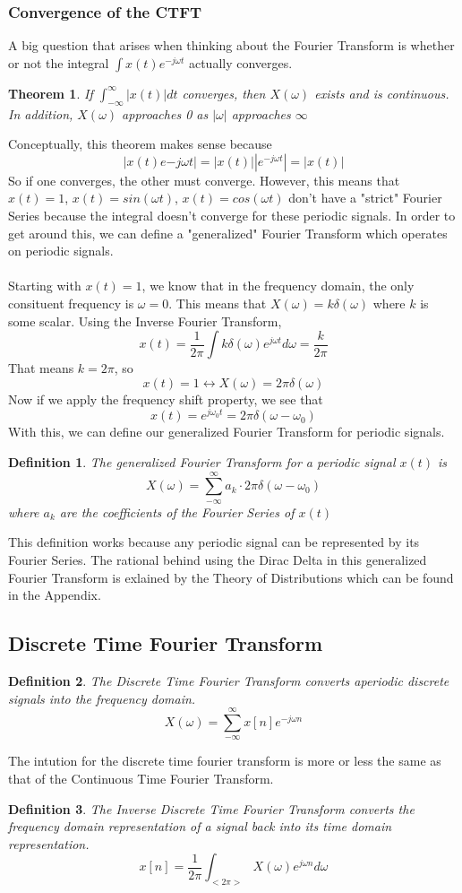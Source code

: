 \documentclass{article}
\newtheorem{theorem}{Theorem}
\newtheorem{definition}{Definition}
\begin{document}
\subsubsection{Convergence of the CTFT}
A big question that arises when thinking about the Fourier Transform is whether or not the integral $\int{x(t)e^{-j\omega t}}$
actually converges.
\begin{theorem}
    If $\int_{-\infty}^{\infty}{|x(t)|dt}$ converges, then $X(\omega)$ exists and is continuous.
    In addition, $X(\omega)$ approaches 0 as $|\omega|$ approaches $\infty$
\end{theorem}
Conceptually, this theorem makes sense because
$$|x(t)e{-j\omega t}| = |x(t)| |e^{-j\omega t}| = |x(t)|$$
So if one converges, the other must converge. However, this means that $x(t)=1$, $x(t)=sin(\omega t)$, $x(t)=cos(\omega t)$
don't have a "strict" Fourier Series because the integral doesn't converge for these periodic signals. In order to get around this,
we can define a "generalized" Fourier Transform which operates on periodic signals.\\\\
Starting with $x(t)=1$, we know that in the frequency domain, the only consituent frequency is $\omega=0$.
This means that $X(\omega) = k\delta(\omega)$ where $k$ is some scalar.
Using the Inverse Fourier Transform,
$$x(t) = \frac{1}{2\pi}\int{k\delta(\omega)e^{j\omega t}d\omega} = \frac{k}{2\pi}$$
That means $k = 2\pi$, so
$$x(t) = 1 \leftrightarrow X(\omega) = 2\pi \delta(\omega)$$
Now if we apply the frequency shift property, we see that
$$x(t) = e^{j\omega_0 t} = 2\pi \delta(\omega - \omega_0)$$
With this, we can define our generalized Fourier Transform for periodic signals.
\begin{definition}
    The generalized Fourier Transform for a periodic signal $x(t)$ is
    $$X(\omega) = \sum_{-\infty}^{\infty}{a_k\cdot 2\pi \delta(\omega - \omega_0)}$$
    where $a_k$ are the coefficients of the Fourier Series of $x(t)$
\end{definition}
This definition works because any periodic signal can be represented by its Fourier Series.
The rational behind using the Dirac Delta in this generalized Fourier Transform is exlained by the 
Theory of Distributions which can be found in the Appendix. %
\subsection{Discrete Time Fourier Transform}
\begin{definition}
    The Discrete Time Fourier Transform converts aperiodic discrete signals into the frequency domain.
    $$X(\omega) = \sum_{-\infty}^{\infty}{x[n]e^{-j\omega n}}$$
\end{definition}
The intution for the discrete time fourier transform is more or less the same as that of the Continuous Time Fourier Transform.
\begin{definition}
    The Inverse Discrete Time Fourier Transform converts the frequency domain representation of a signal
    back into its time domain representation.
    $$x[n] = \frac{1}{2\pi}\int_{<2\pi>}{X(\omega)e^{j\omega n}d\omega}$$
\end{definition}
\end{document}
